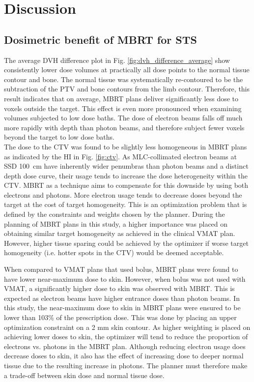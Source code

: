 \documentclass[aapm,graphicx,superscriptaddress]{revtex4-1}
\begin{document}
\section{Discussion}

\subsection{Dosimetric benefit of MBRT for STS}

The average DVH difference plot in Fig. \ref{fig:dvh_difference_average} show consistently lower dose volumes at practically all dose points to the normal tissue contour and bone. The normal tissue was systematically re-contoured to be the subtraction of the PTV and bone contours from the limb contour. Therefore, this result indicates that on average, MBRT plans deliver significantly less dose to voxels outside the target. This effect is even more pronounced when examining volumes subjected to low dose baths. The dose of electron beams falls off much more rapidly with depth than photon beams, and therefore subject fewer voxels beyond the target to low dose baths.\\

The dose to the CTV was found to be slightly less homogeneous in MBRT plans as indicated by the HI in Fig. \ref{fig:ctv}. As MLC-collimated electron beams at SSD 100~cm have inherently wider penumbras than photon beams and a distinct depth dose curve, their usage tends to increase the dose heterogeneity within the CTV. MBRT as a technique aims to compensate for this downside by using both electrons and photons. More electron usage tends to decrease doses beyond the target at the cost of target homogeneity. This is an optimization problem that is defined by the constraints and weights chosen by the planner. During the planning of MBRT plans in this study, a higher importance was placed on obtaining similar target homogeneity as achieved in the clinical VMAT plan. However, higher tissue sparing could be achieved by the optimizer if worse target homogeneity (i.e. hotter spots in the CTV) would be deemed acceptable.

When compared to VMAT plans that used bolus, MBRT plans were found to have lower near-maximum dose to skin. However, when bolus was not used with VMAT, a significantly higher dose to skin was observed with MBRT. This is expected as electron beams have higher entrance doses than photon beams. In this study, the near-maximum dose to skin in MBRT plans were ensured to be lower than 103\% of the prescription dose. This was done by placing an upper optimization constraint on a 2 mm skin contour. As higher weighting is placed on achieving lower doses to skin, the optimizer will tend to reduce the proportion of electrons vs. photons in the MBRT plan. Although reducing electron usage does decrease doses to skin, it also has the effect of increasing dose to deeper normal tissue due to the resulting increase in photons. The planner must therefore make a trade-off between skin dose and normal tissue dose.
\end{document}
